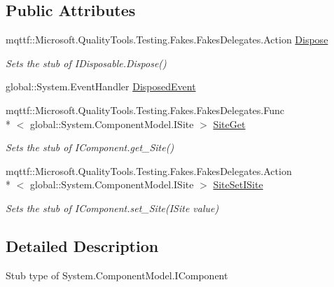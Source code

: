\subsection*{Public Attributes}
\begin{DoxyCompactItemize}
\item 
mqttf\-::\-Microsoft.\-Quality\-Tools.\-Testing.\-Fakes.\-Fakes\-Delegates.\-Action \hyperlink{class_system_1_1_component_model_1_1_fakes_1_1_stub_i_component_ab7c9d0e4baad0dbfc28bcfef043ae25a}{Dispose}
\begin{DoxyCompactList}\small\item\em Sets the stub of I\-Disposable.\-Dispose()\end{DoxyCompactList}\item 
global\-::\-System.\-Event\-Handler \hyperlink{class_system_1_1_component_model_1_1_fakes_1_1_stub_i_component_a248455fedc95a17dfa9436e6c5be7e85}{Disposed\-Event}
\item 
mqttf\-::\-Microsoft.\-Quality\-Tools.\-Testing.\-Fakes.\-Fakes\-Delegates.\-Func\\*
$<$ global\-::\-System.\-Component\-Model.\-I\-Site $>$ \hyperlink{class_system_1_1_component_model_1_1_fakes_1_1_stub_i_component_a54b2688e68cd447b4919ec91b44ee20b}{Site\-Get}
\begin{DoxyCompactList}\small\item\em Sets the stub of I\-Component.\-get\-\_\-\-Site()\end{DoxyCompactList}\item 
mqttf\-::\-Microsoft.\-Quality\-Tools.\-Testing.\-Fakes.\-Fakes\-Delegates.\-Action\\*
$<$ global\-::\-System.\-Component\-Model.\-I\-Site $>$ \hyperlink{class_system_1_1_component_model_1_1_fakes_1_1_stub_i_component_af27a69329ad64d82e66867583cf403ed}{Site\-Set\-I\-Site}
\begin{DoxyCompactList}\small\item\em Sets the stub of I\-Component.\-set\-\_\-\-Site(\-I\-Site value)\end{DoxyCompactList}\end{DoxyCompactItemize}


\subsection{Detailed Description}
Stub type of System.\-Component\-Model.\-I\-Component




